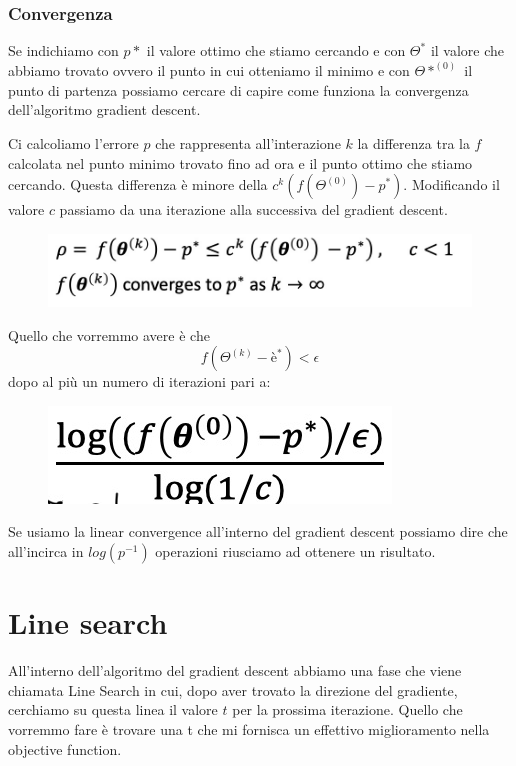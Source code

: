 \documentclass[14pt]{extreport}
\begin{document}
\subsubsection{Convergenza}

Se indichiamo con $p*$ il valore ottimo che stiamo cercando e con $\Theta^{*}$ il valore che abbiamo trovato ovvero il punto in cui otteniamo il
minimo e con $\Theta*^{(0)}$ il punto di partenza possiamo cercare di capire come funziona la convergenza dell'algoritmo gradient descent.

Ci calcoliamo l'errore $p$ che rappresenta all'interazione $k$ la differenza tra la $f$ calcolata nel punto minimo trovato fino ad ora e il punto
ottimo che stiamo cercando. Questa differenza è minore della $c^k(f(\Theta ^{(0)})-p^*)$. Modificando il valore $c$ passiamo da una iterazione alla
successiva del gradient descent.

\begin{figure}[H]
\centering
\includegraphics[width=0.7\linewidth]{239.jpeg}
\end{figure}

Quello che vorremmo avere è che $$f(\Theta^{(k)}-è^{*}) < \epsilon$$ dopo al più un numero di iterazioni pari a:

\begin{figure}[H]
\centering
\includegraphics[width=0.4\linewidth]{240.jpeg}
\end{figure}

Se usiamo la linear convergence all'interno del gradient descent possiamo dire che all'incirca in $log(p^{-1})$ operazioni riusciamo ad ottenere un
risultato.

\section{Line search}

All'interno dell'algoritmo del gradient descent abbiamo una fase che viene chiamata Line Search in cui, dopo aver trovato la direzione del gradiente,
cerchiamo su questa linea il valore $t$ per la prossima iterazione. Quello che vorremmo fare è trovare una t che mi fornisca un effettivo
miglioramento nella objective function.
\end{document}
